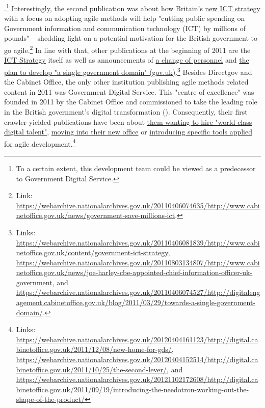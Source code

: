 {{}.}\footnote{To a certain extent, this development team could be viewed as a predecessor to Government Digital Service.} Interestingly, the second publication was about how Britain's \href{https://webarchive.nationalarchives.gov.uk/20110406081839/http://www.cabinetoffice.gov.uk/content/government-ict-strategy}{new ICT strategy} with a focus on adopting agile methods will help "cutting public spending on Government information and communication technology (ICT) by millions of pounds" – shedding light on a potential motivation for the British government to go agile.\footnote{Link: \url{https://webarchive.nationalarchives.gov.uk/20110406074635/http://www.cabinetoffice.gov.uk/news/government-save-millions-ict}.} In line with that, other publications at the beginning of 2011 are the \href{https://webarchive.nationalarchives.gov.uk/20110406081839/http://www.cabinetoffice.gov.uk/content/government-ict-strategy}{ICT Strategy} itself as well as announcements of \href{https://webarchive.nationalarchives.gov.uk/20110803134807/http://www.cabinetoffice.gov.uk/news/joe-harley-cbe-appointed-chief-information-officer-uk-government}{a change of personnel} and \href{https://webarchive.nationalarchives.gov.uk/20110406074527/http://digitalengagement.cabinetoffice.gov.uk/blog/2011/03/29/towards-a-single-government-domain/}{the plan to develop "a single government domain" (gov.uk)}.\footnote{Links: \url{https://webarchive.nationalarchives.gov.uk/20110406081839/http://www.cabinetoffice.gov.uk/content/government-ict-strategy}, \url{https://webarchive.nationalarchives.gov.uk/20110803134807/http://www.cabinetoffice.gov.uk/news/joe-harley-cbe-appointed-chief-information-officer-uk-government}, and \url{https://webarchive.nationalarchives.gov.uk/20110406074527/http://digitalengagement.cabinetoffice.gov.uk/blog/2011/03/29/towards-a-single-government-domain/}.} Besides Directgov and the Cabinet Office, the only other institution publishing agile methods related content in 2011 was Government Digital Service. This "centre of excellence" was founded in 2011 by the Cabinet Office and commissioned to take the leading role in the British government's digital transformation (\cite{GovernmentDigitalService2020}). Consequently, their first crawler yielded publications have been about \href{https://webarchive.nationalarchives.gov.uk/20120404152514/http://digital.cabinetoffice.gov.uk/2011/10/25/the-second-lever/}{them wanting to hire "world-class digital talent"}, \href{https://webarchive.nationalarchives.gov.uk/20120404161123/http://digital.cabinetoffice.gov.uk/2011/12/08/new-home-for-gds/}{moving into their new office} or \href{https://webarchive.nationalarchives.gov.uk/20121102172608/http://digital.cabinetoffice.gov.uk/2011/09/19/introducing-the-needotron-working-out-the-shape-of-the-product/}{introducing specific tools applied for agile development}.\footnote{Links: \url{https://webarchive.nationalarchives.gov.uk/20120404161123/http://digital.cabinetoffice.gov.uk/2011/12/08/new-home-for-gds/}, \url{https://webarchive.nationalarchives.gov.uk/20120404152514/http://digital.cabinetoffice.gov.uk/2011/10/25/the-second-lever/}, and \url{https://webarchive.nationalarchives.gov.uk/20121102172608/http://digital.cabinetoffice.gov.uk/2011/09/19/introducing-the-needotron-working-out-the-shape-of-the-product/}}
